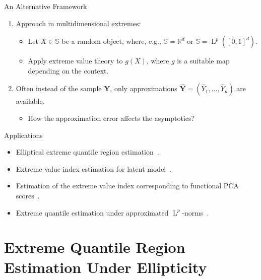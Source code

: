 \documentclass[11pt, aspectratio=169]{beamer}
\DeclareMathOperator{\lp}{L}
\begin{document}

\begin{frame}{An Alternative Framework}
  \begin{enumerate}
    \item Approach in multidimensional extremes:
    \begin{itemize}
      \item Let $X\in \mathbb{S}$ be a random object, where, e.g., $\mathbb{S} =
      \mathbb{R}^d$ or $\mathbb{S} = \lp^p([0,1]^d)$.
      \pause
      \item Apply extreme value theory to $g(X)$, where $g$ is a suitable map
      depending on the context.
    \end{itemize}
    \pause
    \item Often instead of the sample $\bm Y$, only approximations $\hat{\bm Y}
    = (\hat Y_1, \ldots, \hat Y_n)$ are available.
    \pause
    \begin{itemize}
      \item How the approximation error affects the asymptotics?
    \end{itemize}
  \end{enumerate}
\end{frame}


\begin{frame}{Applications}
  \begin{itemize}
    \item Elliptical extreme quantile region estimation~\parencite{pere2024}.
    \item Extreme value index estimation for latent model~\parencite{virta2024}.
    \item Estimation of the extreme value index corresponding to functional PCA
    scores~\parencite{kim2019}.
    \item Extreme quantile estimation under approximated
    $\lp^p$-norms~\parencite{pere2024b}.
  \end{itemize}
\end{frame}


\section{Extreme Quantile Region Estimation Under Ellipticity}

\end{document}
